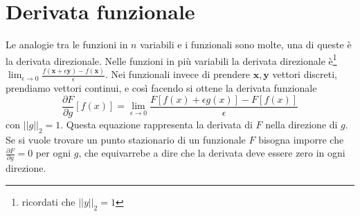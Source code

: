 \documentclass[11pt,a4paper]{article}
\theoremstyle{definition}
\theoremstyle{plain}
\theoremstyle{plain}
\begin{document}
	\section{Derivata funzionale}
		Le analogie tra le funzioni in $n$ variabili e i funzionali sono molte, una di queste è la derivata direzionale.\newline
		Nelle funzioni in più variabili la derivata direzionale è\footnote{ricordati che $||y||_2=1$} $\lim_{\epsilon \to 0}\frac{f(\mathbf{x}+\epsilon\mathbf{y})-f(\mathbf{x})}{\epsilon}$. Nei funzionali invece di prendere $\mathbf{x},\mathbf{y}$ vettori discreti, prendiamo vettori continui, e così facendo si ottene la derivata funzionale
		\begin{equation}
			\frac{\partial F}{\partial g}[f(x)]=\lim_{\epsilon \to 0}\frac{F[f(x)+\epsilon g(x)]-F[f(x)]}{\epsilon}
		\end{equation}
		con $||g||_2=1$. Questa equazione rappresenta la derivata di $F$ nella direzione di $g$.\newline
		Se si vuole trovare un punto stazionario di un funzionale $F$ bisogna imporre che $\frac{\partial F}{\partial g}=0$ per ogni $g$, che equivarrebe a dire che la derivata deve essere zero in ogni direzione.\newline
\end{document}
